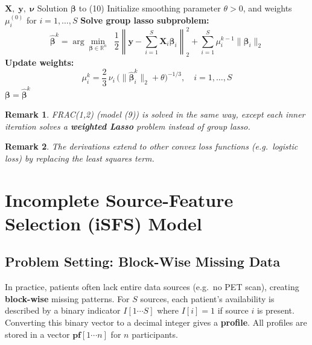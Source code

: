 \documentclass[11pt,a4paper]{article}
\newtheorem{remark}{Remark}
\begin{document}
\begin{algorithm}[H]
\caption{DC Algorithm for solving formulation (10)}
\begin{algorithmic}[1]
\REQUIRE $\mathbf{X},\; \mathbf{y},\; \boldsymbol{\nu}$
\ENSURE Solution $\boldsymbol{\beta}$ to (10)
\STATE Initialize smoothing parameter $\theta > 0$, and weights $\mu_i^{(0)}$ for $i = 1,\ldots,S$
    \STATE \textbf{Solve group lasso subproblem:}
    \[
    \hat{\boldsymbol{\beta}}^k = \arg\min_{\boldsymbol{\beta}\in\mathbb{R}^n} \;\;
    \frac{1}{2}\left\|\mathbf{y} - \sum_{i=1}^{S}\mathbf{X}_i\boldsymbol{\beta}_i\right\|_2^2
    + \sum_{i=1}^{S} \mu_i^{k-1}\|\boldsymbol{\beta}_i\|_2
    \]
    \STATE \textbf{Update weights:}
    \[
    \mu_i^{k} = \frac{2}{3}\,\nu_i\,\bigl(\|\hat{\boldsymbol{\beta}}_i^k\|_2 + \theta\bigr)^{-1/3}, \quad i = 1,\ldots,S
    \]
        \RETURN $\boldsymbol{\beta} = \hat{\boldsymbol{\beta}}^k$
    \ENDIF
\ENDFOR
\end{algorithmic}
\end{algorithm}

\begin{remark}
FRAC(1,2) (model (9)) is solved in the same way, except each inner iteration solves a \textbf{weighted Lasso} problem instead of group lasso.
\end{remark}

\begin{remark}
The derivations extend to other convex loss functions (e.g.\ logistic loss) by replacing the least squares term.
\end{remark}


\newpage
\section{Incomplete Source-Feature Selection (iSFS) Model}

\subsection{Problem Setting: Block-Wise Missing Data}

In practice, patients often lack entire data sources (e.g.\ no PET scan), creating \textbf{block-wise} missing patterns. For $S$ sources, each patient's availability is described by a binary indicator $I[1\cdots S]$ where $I[i]=1$ if source $i$ is present. Converting this binary vector to a decimal integer gives a \textbf{profile}. All profiles are stored in a vector $\mathbf{pf}[1\cdots n]$ for $n$ participants.
\end{document}
